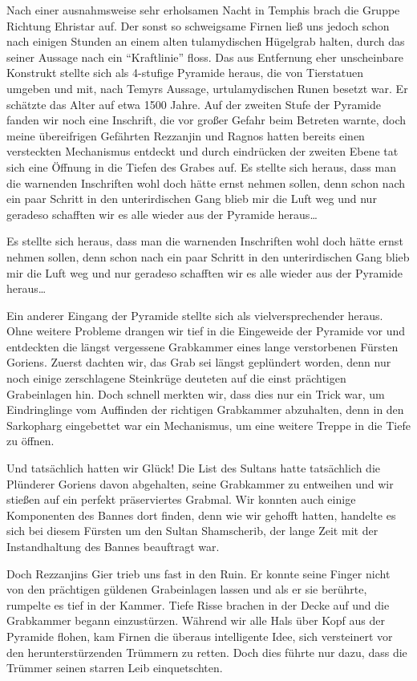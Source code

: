 Nach einer ausnahmsweise sehr erholsamen Nacht in Temphis brach die Gruppe Richtung Ehristar auf. Der sonst so schweigsame Firnen ließ uns jedoch schon nach einigen Stunden an einem alten tulamydischen Hügelgrab halten, durch das seiner Aussage nach ein ``Kraftlinie'' floss. Das aus Entfernung eher unscheinbare Konstrukt stellte sich als 4-stufige Pyramide heraus, die von Tierstatuen umgeben und mit, nach Temyrs Aussage, urtulamydischen Runen besetzt war. Er schätzte das Alter auf etwa 1500 Jahre. Auf der zweiten Stufe der Pyramide fanden wir noch eine Inschrift, die vor großer Gefahr beim Betreten warnte, doch meine übereifrigen Gefährten Rezzanjin und Ragnos hatten bereits einen versteckten Mechanismus entdeckt und durch eindrücken der zweiten Ebene tat sich eine Öffnung in die Tiefen des Grabes auf. Es stellte sich heraus, dass man die warnenden Inschriften wohl doch hätte ernst nehmen sollen, denn schon nach ein paar Schritt in den unterirdischen Gang blieb mir die Luft weg und nur geradeso schafften wir es alle wieder aus der Pyramide heraus\dots

Es stellte sich heraus, dass man die warnenden Inschriften wohl doch hätte ernst nehmen sollen, denn schon nach ein paar Schritt in den unterirdischen Gang blieb mir die Luft weg und nur geradeso schafften wir es alle wieder aus der Pyramide heraus\dots

Ein anderer Eingang der Pyramide stellte sich als vielversprechender heraus. Ohne weitere Probleme drangen wir tief in die Eingeweide der Pyramide vor und entdeckten die längst vergessene Grabkammer eines lange verstorbenen Fürsten Goriens. Zuerst dachten wir, das Grab sei längst geplündert worden, denn nur noch einige zerschlagene Steinkrüge deuteten auf die einst prächtigen Grabeinlagen hin. Doch schnell merkten wir, dass dies nur ein Trick war, um Eindringlinge vom Auffinden der richtigen Grabkammer abzuhalten, denn in den Sarkopharg eingebettet war ein Mechanismus, um eine weitere Treppe in die Tiefe zu öffnen.

Und tatsächlich hatten wir Glück! Die List des Sultans hatte tatsächlich die Plünderer Goriens davon abgehalten, seine Grabkammer zu entweihen und wir stießen auf ein perfekt präserviertes Grabmal. Wir konnten auch einige Komponenten des Bannes dort finden, denn wie wir gehofft hatten, handelte es sich bei diesem Fürsten um den Sultan Shamscherib, der lange Zeit mit der Instandhaltung des Bannes beauftragt war.

Doch Rezzanjins Gier trieb uns fast in den Ruin. Er konnte seine Finger nicht von den prächtigen güldenen Grabeinlagen lassen und als er sie berührte, rumpelte es tief in der Kammer. Tiefe Risse brachen in der Decke auf und die Grabkammer begann einzustürzen. Während wir alle Hals über Kopf aus der Pyramide flohen, kam Firnen die überaus intelligente Idee, sich versteinert vor den herunterstürzenden Trümmern zu retten. Doch dies führte nur dazu, dass die Trümmer seinen starren Leib einquetschten.

